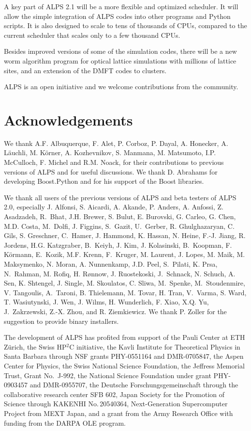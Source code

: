\documentclass[12pt]{iopart}
\begin{document}
A key part of ALPS 2.1 will be a more flexible and optimized scheduler. It will allow  the simple integration of ALPS codes into other programs and Python scripts. It is also designed to scale to tens of thousands of CPUs, compared to the current scheduler that scales only to a few thousand CPUs. 

Besides improved versions of some of the simulation codes, there will be a new worm algorithm program for optical lattice simulations with millions of lattice sites, and an extension of the DMFT codes to clusters.

ALPS is an open initiative and we welcome contributions from the community.


\section{Acknowledgements}

We thank A.F. Albuquerque, F. Alet, P. Corboz, P. Dayal, A. Honecker, A. L\"auchli, M. K\"orner,  A. Kozhevnikov, S. Manmana, M. Matsumoto, I.P. McCulloch, F. Michel and R.M. Noack, for their contributions to previous versions of ALPS and  for useful discussions. We thank D. Abrahams for developing Boost.Python and for his support of the Boost libraries.

We thank all users of the previous versions of ALPS and beta testers of ALPS 2.0, especially J. Alfonsi, S. Aicardi, A. Akande, P. Anders, A. Anfossi, Z. Asadzadeh, R.~Bhat, J.H. Brewer, S. Bulut, E. Burovski, G. Carleo, G. Chen, M.D. Costa, M.~Dolfi, J. Figgins, S.~Gazit, U.~Gerber, R. Ghulghazaryan, C. Gils, S. Greschner, C.~Hamer, J. Hammond, K. Hassan, N. Heine, F.-J. Jiang, R. Jordens, H.G. Katzgraber, B.~Keiyh, J. Kim, J. Kolasinski, B.~Koopman, F. K\"ormann, E.~Kozik, M.F. Krenn, F.~Kruger, M. Laurent, J. Lopes, M. Maik, M. Maksymenko, N. Moran, A. Nunnenkamp, J.D. Peel, S.~Pilati, K. Prsa, N.~Rahman, M. Rofiq, H. R\o nnow, J. Ruostekoski, J.~Schnack, N. Schuch, A. Sen, K. Shtengel, J. Single, M. Skoulatos, C. Sliwa, M.~Spenke, M.~Stoudenmire, V. Tangoulis, A.~Taroni, B. Thielemann, M. Tovar, H. Tran, V.~Varma, S. Ward, T. Wasiutynski, J. Wen, J. Wilms, H. Wunderlich, F. Xiao, X.Q. Yu, J.~Zakrzewski, Z.-X. Zhou, and R. Ziemkiewicz. We thank P. Zoller for the suggestion to provide binary installers. 

The development of ALPS has profited from support of the Pauli Center at ETH Z\"urich, the Swiss HP$^2$C initiative, the Kavli Institute for Theoretical Physics in Santa Barbara through NSF grants  PHY-0551164 and DMR-0705847, the Aspen Center for Physics, the Swiss National Science Foundation, the Jeffress Memorial Trust, Grant No.~J-992, the National Science Foundation under grant PHY-0903457 and DMR-0955707, the Deutsche Forschungsgemeinschaft through the collaborative research center SFB 602, Japan Society for the Promotion of Science through KAKENHI No.\,20540364, Next-Generation Supercomputer Project from MEXT Japan, and a grant from the Army Research Office with funding from the DARPA OLE program. 
\end{document}

